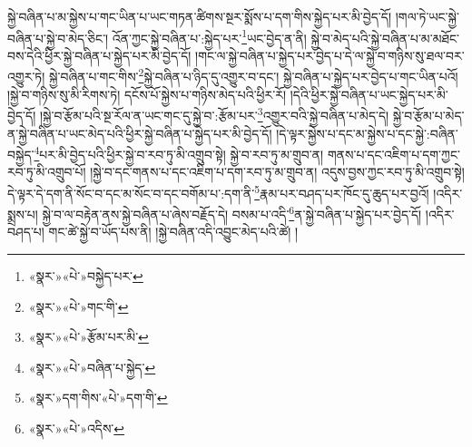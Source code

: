 སྐྱེ་བཞིན་པ་མ་སྐྱེས་པ་གང་ཡིན་པ་ཡང་གཏན་ཚིགས་སྔར་སྨོས་པ་དག་གིས་སྐྱེད་པར་མི་བྱེད་དོ། །གལ་ཏེ་ཡང་སྐྱེ་བཞིན་པ་སྐྱེ་བ་མེད་ཅིང་། འོན་ཀྱང་སྐྱེ་བཞིན་པ་:སྐྱེད་པར་\footnote{«སྣར་»«པེ་»བསྐྱེད་པར་}ཡང་བྱེད་ན་ནི། སྐྱེ་བ་མེད་པའི་སྐྱེ་བཞིན་པ་མ་མཐོང་བས་དེའི་ཕྱིར་སྐྱེ་བཞིན་པ་སྐྱེད་པར་མི་བྱེད་དོ། །གང་ལ་སྐྱེ་བཞིན་པ་སྐྱེད་པར་བྱེད་པ་དེ་ལ་སྐྱེ་བ་གཉིས་སུ་ཐལ་བར་འགྱུར་ཏེ། སྐྱེ་བཞིན་པ་གང་གིས་\footnote{«སྣར་»«པེ་»གང་གི་}སྐྱེ་བཞིན་པ་ཉིད་དུ་འགྱུར་བ་དང་། སྐྱེ་བཞིན་པ་སྐྱེད་པར་བྱེད་པ་གང་ཡིན་པའོ། །སྐྱེ་བ་གཉིས་སུ་མི་རིགས་ཏེ། དངོས་པོ་སྐྱེས་པ་གཉིས་མེད་པའི་ཕྱིར་རོ། །དེའི་ཕྱིར་སྐྱེ་བཞིན་པ་ཡང་སྐྱེད་པར་མི་བྱེད་དོ། །སྐྱེ་བ་རྩོམ་པའི་སྔ་རོལ་ན་ཡང་གང་དུ་སྐྱེ་བ་:རྩོམ་པར་\footnote{«སྣར་»«པེ་»རྩོམ་པར་མི་}འགྱུར་བའི་སྐྱེ་བཞིན་པ་མེད་དེ། སྐྱེ་བ་རྩོམ་པ་མེད་ན་སྐྱེ་བཞིན་པ་ཡང་མེད་པའི་ཕྱིར་སྐྱེ་བཞིན་པ་སྐྱེད་པར་མི་བྱེད་དོ། །དེ་ལྟར་སྐྱེས་པ་དང་མ་སྐྱེས་པ་དང་སྐྱེ་:བཞིན་བསྐྱེད་\footnote{«སྣར་»«པེ་»བཞིན་པ་སྐྱེད་}པར་མི་བྱེད་པའི་ཕྱིར་སྐྱེ་བ་རབ་ཏུ་མི་འགྲུབ་སྟེ། སྐྱེ་བ་རབ་ཏུ་མ་གྲུབ་ན། གནས་པ་དང་འཇིག་པ་དག་ཀྱང་རབ་ཏུ་མི་འགྲུབ་པོ། །སྐྱེ་བ་དང་གནས་པ་དང་འཇིག་པ་དག་རབ་ཏུ་མ་གྲུབ་ན། འདུས་བྱས་ཀྱང་རབ་ཏུ་མི་འགྲུབ་སྟེ། དེ་ལྟར་དེ་དག་ནི་སོང་བ་དང་མ་སོང་བ་དང་བགོམ་པ་:དག་ནི་\footnote{«སྣར་»དག་གིས་«པེ་»དག་གི་}རྣམ་པར་བཤད་པར་ཁོང་དུ་ཆུད་པར་བྱའོ། །འདིར་སྨྲས་པ། སྐྱེ་བ་ལ་བརྟེན་ནས་སྐྱེ་བཞིན་པ་ཞེས་བརྗོད་དེ། བསམ་པ་འདི་\footnote{«སྣར་»«པེ་»འདིས་}ན་སྐྱེ་བཞིན་པ་སྐྱེད་པར་བྱེད་དོ། །འདིར་བཤད་པ། གང་ཚེ་སྐྱེ་བ་ཡོད་པས་ནི། །སྐྱེ་བཞིན་འདི་འབྱུང་མེད་པའི་ཚེ། །
